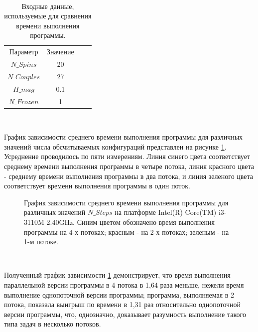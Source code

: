 \documentclass[14pt,a4paper,report]{ncc}
\begin{document}
\
\begin{table}[h!]
\begin{center}
\caption{Входные данные, используемые для сравнения времени выполнения программы.}
\begin{tabular}{cccc}
Параметр & Значение \\
$N\_Spins$   & 20 \\
$N\_Couples$ & 27 \\
$H\_mag$ & 0.1 \\
$N\_Frozen$ & 1\\
 \end{tabular}
\label{table_initial}
\end{center}
\end{table}
\


График зависимости среднего времени выполнения программы для различных значений числа обсчитываемых конфигураций представлен на рисунке \ref{ris:image7}. Усреднение проводилось по пяти измерениям. Линия синего цвета соответствует среднему времени выполнения программы в четыре потока, линия красного цвета - среднему времени выполнения программы в два потока, и линия зеленого цвета соответствует времени выполнения программы в один поток. 
\

\begin{figure}[h!]
\caption{График зависимости среднего времени выполнения программы для различных значений $N\_Steps$ на платформе Intel(R) Core(TM) i3-3110M 2.40GHz.
Синим цветом обозначено время выполнения программы на 4-х потоках; красным - на 2-х потоках; зеленым - на 1-м потоке.}
\label{ris:image7}
\end{figure}
\

Полученный график зависимости \ref{ris:image7} демонстрирует, что время выполнения параллельной версии программы в 4 потока в 1,64 раза меньше, нежели время выполнение однопоточной версии программы; программа, выполняемая в 2 потока, показала выигрыш по времени в 1,31 раз относительно однопоточной версии программы, что, однозначно, доказывает разумность выполнение такого типа задач в несколько потоков.
\
\end{document}
